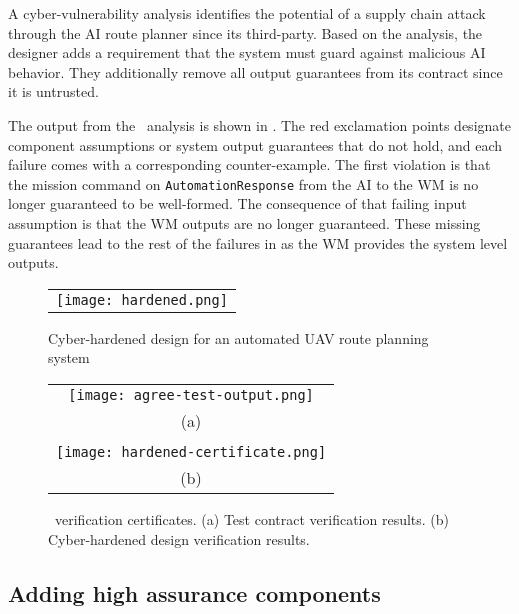 A cyber-vulnerability analysis identifies the potential of a
supply chain attack through the AI route planner since its third-party.  Based on the analysis, the designer adds a requirement that the system must guard against malicious AI behavior.
They additionally remove all output guarantees from its contract since it is untrusted.  

The output from the \agr\ analysis is shown in .  The red
exclamation points designate component assumptions or system output
guarantees that do not hold, and each failure comes with a
corresponding counter-example.  The first violation is that the mission command on \texttt{AutomationResponse} from
the AI to the WM is no longer guaranteed to be well-formed.  The
consequence of that failing input assumption is that the WM outputs
are no longer guaranteed.  These
missing guarantees lead to the rest of the failures
in  as the WM provides the system
level outputs.

\begin{figure*}
  \begin{center}
    \begin{tabular}{c}
      \texttt{[image: hardened.png]}
    \end{tabular}
  \end{center}
  \caption{Cyber-hardened design for an automated UAV route planning system}
  \label{fig:hardened}
\end{figure*}

\begin{figure}
  \begin{center}
    \begin{tabular}{c}
      \texttt{[image: agree-test-output.png]} \\
      (a) \\ \\
      \texttt{[image: hardened-certificate.png]} \\
      (b)    
    \end{tabular}
  \end{center}
  \caption{\agr\ verification certificates. (a) Test contract verification results. (b) Cyber-hardened design verification results.}
  \label{fig:hardened-certificate}
\end{figure}

\subsection{Adding high assurance components}

